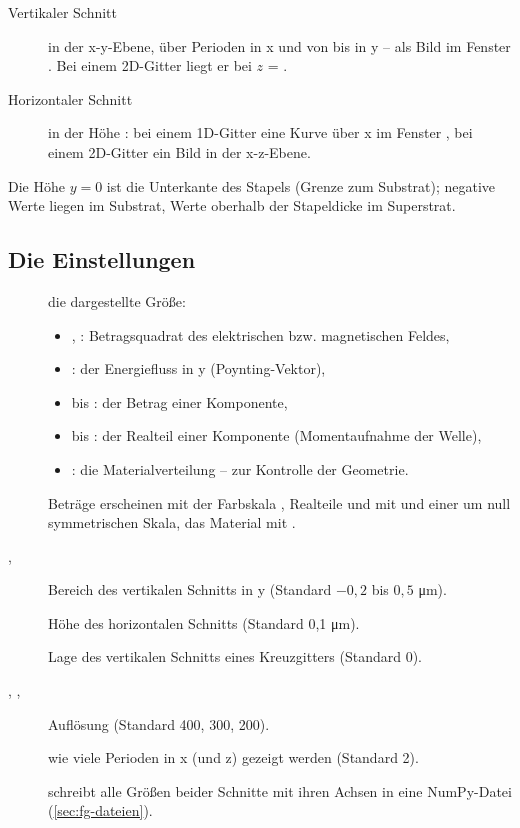 \begin{description}
  \item[Vertikaler Schnitt] in der x-y-Ebene, über  Perioden in x und von 
    bis  in y -- als Bild im Fenster . Bei einem 2D-Gitter liegt er bei
    $z$ = .
  \item[Horizontaler Schnitt] in der Höhe : bei einem 1D-Gitter eine
    Kurve über x im Fenster , bei einem 2D-Gitter ein Bild in der x-z-Ebene.
\end{description}

Die Höhe $y = 0$ ist die Unterkante des Stapels (Grenze zum Substrat); negative Werte liegen im
Substrat, Werte oberhalb der Stapeldicke im Superstrat.

\subsection{Die Einstellungen}

\begin{description}
  \item[] die dargestellte Größe:
    \begin{itemize}
      \item {}, : Betragsquadrat des elektrischen bzw. magnetischen
        Feldes,
      \item {}: der Energiefluss in y (Poynting-Vektor),
      \item {} bis : der Betrag einer Komponente,
      \item {} bis : der Realteil einer Komponente (Momentaufnahme der Welle),
      \item {}: die Materialverteilung -- zur Kontrolle der Geometrie.
    \end{itemize}
    Beträge erscheinen mit der Farbskala , Realteile und  mit
     und einer um null symmetrischen Skala, das Material mit .
  \item[, ] Bereich des vertikalen Schnitts in y (Standard $-0{,}2$ bis
    $0{,}5$ \si{\micro\metre}).
  \item[] Höhe des horizontalen Schnitts (Standard 0,1 \si{\micro\metre}).
  \item[] Lage des vertikalen Schnitts eines Kreuzgitters (Standard 0).
  \item[, , ] Auflösung (Standard 400, 300, 200).
  \item[] wie viele Perioden in x (und z) gezeigt werden (Standard 2).
  \item[] schreibt alle Größen beider Schnitte mit ihren Achsen in eine
    NumPy-Datei (\autoref{sec:fg-dateien}).
\end{description}


